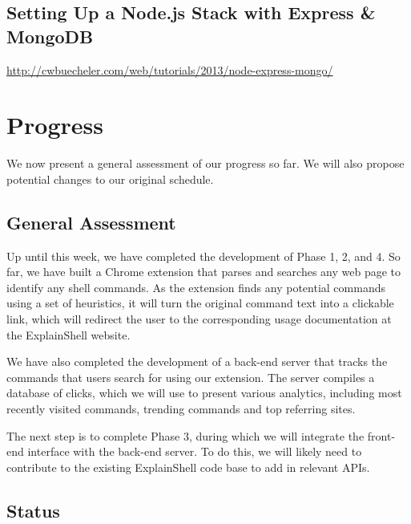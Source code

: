 \documentclass[11pt]{article}
\begin{document}
\subsection{Setting Up a Node.js Stack with Express \& MongoDB}

\url{http://cwbuecheler.com/web/tutorials/2013/node-express-mongo/}

\section{Progress}

We now present a general assessment of our progress so far. We will
also propose potential changes to our original schedule.

\subsection{General Assessment}
Up until this week, we have completed the development of Phase 1, 2, and 4.
So far, we have built a Chrome extension that parses and searches any web page
to identify any shell commands. As the extension finds any potential
commands using a set of heuristics, it will turn the original command text 
into a clickable link, which will redirect the user to the corresponding
usage documentation at the ExplainShell website.

We have also completed the development of a back-end server that tracks
the commands that users search for using our extension. The server compiles
a database of clicks, which we will use to present various analytics, 
including most recently visited commands, trending commands and top referring
sites.

The next step is to complete Phase 3, during which we will integrate the 
front-end interface with the back-end server. To do this, we will likely need
to contribute to the existing ExplainShell code base to add in relevant APIs.

\subsection{Status}
\end{document}
